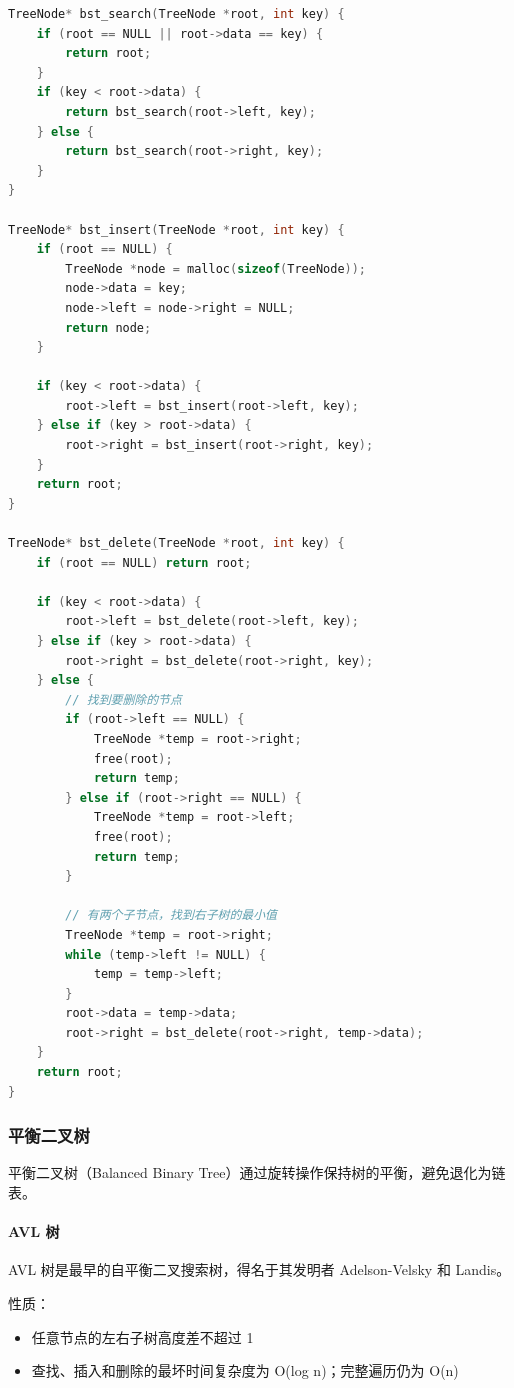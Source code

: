 \begin{lstlisting}[language=C, caption={二叉搜索树操作}]
TreeNode* bst_search(TreeNode *root, int key) {
    if (root == NULL || root->data == key) {
        return root;
    }
    if (key < root->data) {
        return bst_search(root->left, key);
    } else {
        return bst_search(root->right, key);
    }
}

TreeNode* bst_insert(TreeNode *root, int key) {
    if (root == NULL) {
        TreeNode *node = malloc(sizeof(TreeNode));
        node->data = key;
        node->left = node->right = NULL;
        return node;
    }

    if (key < root->data) {
        root->left = bst_insert(root->left, key);
    } else if (key > root->data) {
        root->right = bst_insert(root->right, key);
    }
    return root;
}

TreeNode* bst_delete(TreeNode *root, int key) {
    if (root == NULL) return root;

    if (key < root->data) {
        root->left = bst_delete(root->left, key);
    } else if (key > root->data) {
        root->right = bst_delete(root->right, key);
    } else {
        // 找到要删除的节点
        if (root->left == NULL) {
            TreeNode *temp = root->right;
            free(root);
            return temp;
        } else if (root->right == NULL) {
            TreeNode *temp = root->left;
            free(root);
            return temp;
        }

        // 有两个子节点，找到右子树的最小值
        TreeNode *temp = root->right;
        while (temp->left != NULL) {
            temp = temp->left;
        }
        root->data = temp->data;
        root->right = bst_delete(root->right, temp->data);
    }
    return root;
}
\end{lstlisting}

\subsubsection{平衡二叉树}

平衡二叉树（Balanced Binary Tree）通过旋转操作保持树的平衡，避免退化为链表。

\paragraph{AVL 树}

AVL 树是最早的自平衡二叉搜索树，得名于其发明者 Adelson-Velsky 和 Landis。

性质：
\begin{itemize}
  \item 任意节点的左右子树高度差不超过 1
  \item 查找、插入和删除的最坏时间复杂度为 O(log n)；完整遍历仍为 O(n)
\end{itemize}

